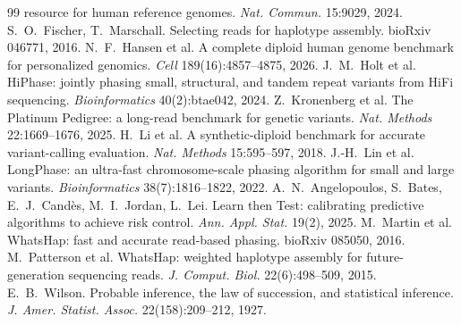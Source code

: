 \documentclass[11pt]{article}
\begin{document}
\begin{thebibliography}{99}
resource for human reference genomes. \emph{Nat. Commun.} 15:9029, 2024.
 S.~O.~Fischer, T.~Marschall. Selecting reads for
haplotype assembly. bioRxiv 046771, 2016.
 N.~F.~Hansen et al. A complete diploid human genome
benchmark for personalized genomics. \emph{Cell} 189(16):4857--4875, 2026.
 J.~M.~Holt et al. HiPhase: jointly phasing small,
structural, and tandem repeat variants from HiFi sequencing.
\emph{Bioinformatics} 40(2):btae042, 2024.
 Z.~Kronenberg et al. The Platinum Pedigree: a
long-read benchmark for genetic variants. \emph{Nat. Methods}
22:1669--1676, 2025.
 H.~Li et al. A synthetic-diploid benchmark for accurate
variant-calling evaluation. \emph{Nat. Methods} 15:595--597, 2018.
 J.-H.~Lin et al. LongPhase: an ultra-fast chromosome-scale
phasing algorithm for small and large variants. \emph{Bioinformatics}
38(7):1816--1822, 2022.
 A.~N.~Angelopoulos, S.~Bates, E.~J.~Cand\`es, M.~I.~Jordan,
L.~Lei. Learn then Test: calibrating predictive algorithms to achieve risk
control. \emph{Ann. Appl. Stat.} 19(2), 2025.
 M.~Martin et al. WhatsHap: fast and accurate read-based
phasing. bioRxiv 085050, 2016.
 M.~Patterson et al. WhatsHap: weighted haplotype
assembly for future-generation sequencing reads. \emph{J. Comput. Biol.}
22(6):498--509, 2015.
 E.~B.~Wilson. Probable inference, the law of succession,
and statistical inference. \emph{J. Amer. Statist. Assoc.} 22(158):209--212,
1927.
\end{thebibliography}
\end{document}
